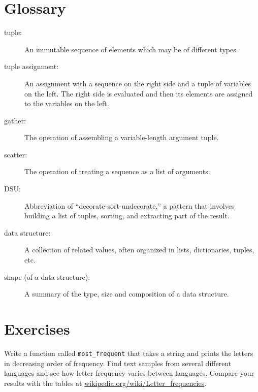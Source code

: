 \documentclass[10pt]{book}
\begin{document}

\section{Glossary}

\begin{description}

\item[tuple:] An immutable sequence of elements which may be of different types.

\item[tuple assignment:] An assignment with a sequence on the
right side and a tuple of variables on the left.  The right
side is evaluated and then its elements are assigned to the
variables on the left.

\item[gather:] The operation of assembling a variable-length
argument tuple.

\item[scatter:] The operation of treating a sequence as a list of
arguments.

\item[DSU:] Abbreviation of ``decorate-sort-undecorate,'' a
pattern that involves building a list of tuples, sorting, and
extracting part of the result.

\item[data structure:] A collection of related values, often
organized in lists, dictionaries, tuples, etc.

\item[shape (of a data structure):] A summary of the type,
size and composition of a data structure.

\end{description}


\section{Exercises}
\begin{ex}
Write a function called \verb"most_frequent" that takes a string and
prints the letters in decreasing order of frequency.  Find text
samples from several different languages and see how letter frequency
varies between languages.  Compare your results with the tables at
\url{wikipedia.org/wiki/Letter_frequencies}.


\end{ex}
\end{document}
